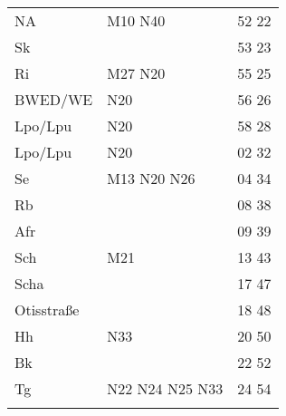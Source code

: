 \begin{tabular}{!{\color{schiefergrau}\vrule width 3pt}*{3}{l!{\color{schiefergrau}\vrule width 3pt}}}
NA           & \mtram{} M10 \nbus{} N40            & 52 22 \\
Sk           &                                     & 53 23 \\
Ri           & \mbus{} M27 \nbus{} N20             & 55 25 \\
BWED/WE      & \nbus{} N20                         & 56 26 \\
Lpo/Lpu      & \nuneun{} \nbus{} N20               & 58 28 \\
\hline
Lpo/Lpu      & \nuneun{} \nbus{} N20               & 02 32 \\
Se           & \mtram{} M13 \nbus{} N20 N26        & 04 34 \\
Rb           &                                     & 08 38 \\
Afr          &                                     & 09 39 \\
Sch          & \mbus{} M21                         & 13 43 \\
Scha         &                                     & 17 47 \\
Otisstraße   &                                     & 18 48 \\
Hh           & \nbus{} N33                         & 20 50 \\
Bk           &                                     & 22 52 \\
Tg           & \nbus{} N22 N24 N25 N33             & 24 54 \\
\myhline
\end{tabular}
